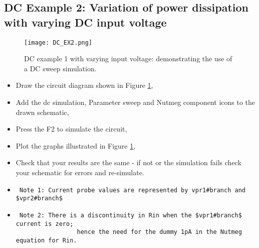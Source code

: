 \subsection{ DC Example 2: Variation of power dissipation with varying DC input voltage}
\begin{figure}[ht]
	\centering
	\texttt{[image: DC\_EX2.png]}
	\caption{DC example 1 with varying input voltage: demonstrating the use of a DC sweep simulation. }
	\label{Fig21}
\end{figure}
\begin{itemize}
	\item {Draw the circuit diagram shown in Figure \ref{Fig21},}
	\item {Add the dc simulation, Parameter sweep and Nutmeg component icons to the drawn schematic,}
	\item {Press the F2 to simulate the circuit, }
	\item {Plot the graphs illustrated in Figure \ref{Fig21}, }
	\item{Check that your results are the same - if not or the simulation fails check your schematic for errors and re-simulate.}
	\item {\begin{verbatim} Note 1: Current probe values are represented by vpr1#branch and $vpr2#branch$ \end{verbatim} }
		\item {\begin{verbatim} Note 2: There is a discontinuity in Rin when the $vpr1#branch$ current is zero;
				 hence the need for the dummy 1pA in the Nutmeg equation for Rin.\end{verbatim} }
	\end{itemize}

\endinput

